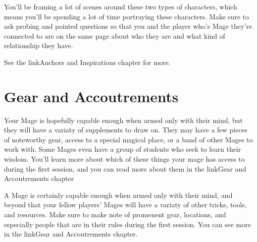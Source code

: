 \documentclass[
  oneside,
  statementpaper,
  9pt]{memoir}
\begin{document}
\begin{MC}

You'll be framing a lot of scenes around these two types of characters, which means you'll be spending a lot of time portraying these characters. Make sure to ask probing and pointed questions so that you and the player who's Mage they're connected to are on the same page about who they are and what kind of relationship they have.

See the {{linkAnchors and Inspirations chapter}} for more.

\end{MC}

\hypertarget{gear-and-accoutrements}{%
\section{Gear and Accoutrements}\label{gear-and-accoutrements}}

\begin{Player}

Your Mage is hopefully capable enough when armed only with their mind, but they will have a variaty of supplements to draw on. They may have a few pieces of noteworthy gear, access to a special magical place, or a band of other Mages to work with. Some Mages even have a group of students who seek to learn their wisdom. You'll learn more about which of these things your mage has access to during the first session, and you can read more about them in the {{linkGear and Accoutrements chapter}}

\end{Player}

\begin{MC}

A Mage is certainly capable enough when armed only with their mind, and beyond that your fellow players' Mages will have a variaty of other tricks, tools, and resources. Make sure to make note of promenent gear, locations, and especially people that are in their rules during the first session. You can see more in the {{linkGear and Accoutrements chapter}}.

\end{MC}
\end{document}
